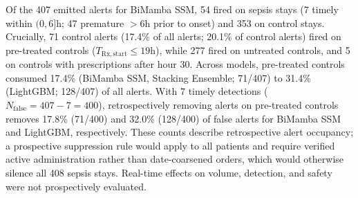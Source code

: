 \documentclass[10pt,twocolumn,a4paper]{article}
\begin{document}
Of the 407 emitted alerts for BiMamba SSM, 54 fired on sepsis stays (7 timely within $(0, 6]\text{h}$; 47 premature $>6\text{h}$ prior to onset) and 353 on control stays. Crucially, 71 control alerts (17.4\% of all alerts; 20.1\% of control alerts) fired on pre-treated controls ($T_{\mathrm{Rx,start}} \le 19\text{h}$), while 277 fired on untreated controls, and 5 on controls with prescriptions after hour 30. Across models, pre-treated controls consumed 17.4\% (BiMamba SSM, Stacking Ensemble; 71/407) to 31.4\% (LightGBM; 128/407) of all alerts. With 7 timely detections ($N_{\mathrm{false}} = 407 - 7 = 400$), retrospectively removing alerts on pre-treated controls removes 17.8\% (71/400) and 32.0\% (128/400) of false alerts for BiMamba SSM and LightGBM, respectively. These counts describe retrospective alert occupancy; a prospective suppression rule would apply to all patients and require verified active administration rather than date-coarsened orders, which would otherwise silence all 408 sepsis stays. Real-time effects on volume, detection, and safety were not prospectively evaluated.
\end{document}
